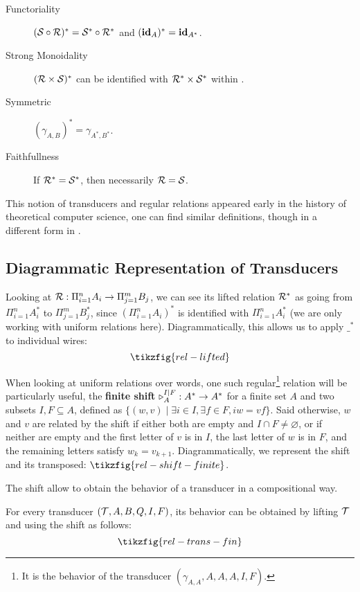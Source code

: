 \begin{description}
	\item[Functoriality] $({\mathcal{S}} \circ {\mathcal{R}})^* = {\mathcal{S}}^* \circ {\mathcal{R}}^*$ and $(\textbf{\textup{id}}_A)^* = \textbf{\textup{id}}_{A^*}$.
	\item[Strong Monoidality] $({\mathcal{R}} \times {\mathcal{S}})^*$ can be identified with ${\mathcal{R}}^* \times {\mathcal{S}}^*$ within .
	\item[Symmetric] $(\gamma_{A,B})^* = \gamma_{A^*,B^*}$.
	\item[Faithfullness] If ${\mathcal{R}}^* = {\mathcal{S}}^*$, then necessarily ${\mathcal{R}} = {\mathcal{S}}$.
\end{description}

This notion of transducers and regular relations appeared early in the history of theoretical computer science, one can find similar definitions, though in a different form in \cite{DBLP:journals/ibmrd/ElgotM65}.

\subsection{Diagrammatic Representation of Transducers}

Looking at ${\mathcal{R}} : \Pi_{i=1}^n A_i \to \Pi_{j=1}^m B_j$, we can see its lifted relation ${\mathcal{R}}^*$ as going from $\Pi_{i=1}^n A_i^*$ to $\Pi_{j=1}^m B_j^*$, since $(\Pi_{i=1}^n A_i)^*$ is identified with $\Pi_{i=1}^n A_i^*$ (we are only working with uniform relations here).
Diagrammatically, this allows us to apply $\_^*$ to individual wires:
\[ \tikzfig{rel-lifted}\]

When looking at uniform relations over words, one such regular\footnote{It is the behavior of the transducer $(\gamma_{A,A},A,A,A,I,F)$.} relation will be particularly useful, the \textbf{finite shift}  $\shift{I}{F}_A : A^* \to A^*$ for a finite set $A$ and two subsets $I,F \subseteq A$, defined as $\{ (w,v) \mid \exists i \in I, \exists f \in F, iw = vf \}$. Said otherwise, $w$ and $v$ are related by the shift if either both are empty and $I \cap F \neq \varnothing$, or if neither are empty and the first letter of $v$ is in $I$, the last letter of $w$ is in $F$, and the remaining letters satisfy $w_k = v_{k+1}$. Diagrammatically, we represent the shift and its transposed:
$\tikzfig{rel-shift-finite}$.

The shift allow to obtain the behavior of a transducer in a compositional way.

\begin{proposition}\label{prop:transducer-fin}
	For every transducer $({\mathcal{T}}, A, B, Q, I,F)$, its behavior can be obtained by lifting ${\mathcal{T}}$ and using the shift as follows:
	\[ \tikzfig{rel-trans-fin} \]
\end{proposition}

